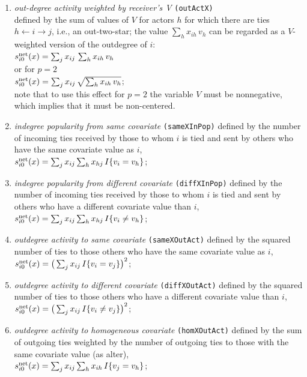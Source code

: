 \documentclass[a4paper,fleqn,11pt]{article}
\newcommand{\+}{\, + \,}
\newcommand{\vit}{\theenumi}
\begin{document}
\begin{enumerate}
 \item {\em out-degree activity weighted by receiver's V }   \texttt{(outActX)}\\
 defined by the sum of values of $V$ for actors $h$
 for which there are ties  $h \leftarrow i \rightarrow j$,
 i.e., an out-two-star;
 the value $\sum_h x_{ih}\,v_h$ can be regarded as a $V$-weighted
 version of the outdegree of $i$:\\
 $s^{\rm net}_{i\vit}(x) =  \sum_j x_{ij}\, \sum_h x_{ih}\,v_h  $ \\
 or for $p=2$ \\
   $s^{\rm net}_{i\vit}(x) =  \sum_j x_{ij}\, \sqrt{\sum_h x_{ih}\,v_h}   $;\\
 note that to use this effect for $p=2$ the variable $V$ must be nonnegative,
 which implies that it must be non-centered.

 \item {\em indegree popularity from same covariate}
\texttt{(sameXInPop)} defined by the
 number of incoming ties received by those to whom $i$ is tied
 and sent by others who have the same covariate value as $i$,\\
 $s^{\rm net}_{i\vit}(x) = \sum_j x_{ij} \sum_h x_{hj}\, I\{v_i = v_h \} $;

 \item {\em indegree popularity from different covariate}
\texttt{(diffXInPop)} defined by the
 number of incoming ties received by those to whom $i$ is tied
 and sent by others who have a different covariate value than $i$,\\
 $s^{\rm net}_{i\vit}(x) = \sum_j x_{ij} \sum_h x_{hj}\, I\{v_i \neq v_h \} $;

 \item {\em outdegree activity to same covariate}
\texttt{(sameXOutAct)} defined by the
 squared number of ties to those
 others who have the same covariate value as $i$,\\
 $s^{\rm net}_{i\vit}(x) = \big(\sum_j x_{ij} \,I\{v_i = v_j \}\big)^2 $;

 \item {\em outdegree activity to different covariate}
\texttt{(diffXOutAct)} defined by the
 squared number of ties to those
 others who have a different covariate value than $i$,\\
 $s^{\rm net}_{i\vit}(x) = \big(\sum_j x_{ij} \,I\{v_i \neq v_j \}\big)^2 $;


 \item {\em outdegree activity to homogeneous covariate}
\texttt{(homXOutAct)} defined by the
 sum of outgoing ties weighted by the number of outgoing
 ties to those with the same covariate value (as alter),\\
 $s^{\rm net}_{i\vit}(x) = \sum_j x_{ij} \sum_h x_{ih} \,I\{v_j = v_h \} $;


\end{enumerate}
\end{document}
